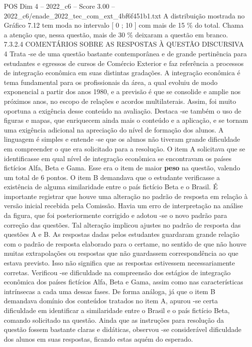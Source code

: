 \begin{textsample}{POS Dim 4 – 2022\_c6 – Score 3.00 – 2022\_c6/enade\_2022\_tec\_com\_ext\_4bf6f451b1.txt}
A distribuição mostrada no Gráfico 7.12 tem moda no intervalo [ 0 ; 10 ] com mais de 15 \% do total.
Chama a atenção que, nessa questão, mais de 30 \% deixaram a questão em branco. 7.3.2.4 COMENTÁRIOS SOBRE AS RESPOSTAS À QUESTÃO DISCURSIVA 4 Trata -se de uma questão bastante contemporânea e de grande pertinência para estudantes e egressos de cursos de Comércio Exterior e faz referência a processos de integração econômica em suas distintas gradações.
A integração econômica é tema fundamental para os profissionais da área, a qual evoluiu de modo exponencial a partir dos anos 1980, e a previsão é que se consolide e amplie nos próximos anos, no escopo de relações e acordos multilaterais.
Assim, foi muito oportuna a exigência desse conteúdo na avaliação.
Destaca -se também o uso de figuras e mapas, que enriquecem ainda mais o conteúdo e a aplicação, e se tornam uma exigência adicional na apreciação do nível de formação dos alunos.
A linguagem é simples e entende -se que os alunos não tiveram grande dificuldade em compreender o que era solicitado para a resolução.
O item A solicitava que se identificasse em qual nível de integração econômica se encontravam os países fictícios Alfa, Beta e Gama.
Esse era o item de maior \textbf{peso} na questão, valendo um total de 6 pontos.
O item B demandava que o estudante verificasse a existência de alguma similaridade entre o país fictício Beta e o Brasil.
É importante registrar que houve uma alteração no padrão de resposta em relação à versão inicial recebida pela Comissão.
Havia um erro de interpretação na análise da figura, que foi posteriormente corrigido e adotou -se o novo padrão para correção das questões.
Tal alteração implicou ajustes no padrão de resposta das questões A e B.
As respostas dadas pelos estudantes guardaram grande relação com o padrão de resposta elaborado para o certame, no sentido de que não houve muitas extrapolações ou respostas que não guardassem correspondência ao que estava previsto.
Isso não significa que as respostas estivessem necessariamente corretas.
Verificou -se dificuldade na compreensão dos estágios de integração econômica dos países fictícios Alfa, Beta e Gama, assim como nas características intrínsecas a cada uma dessas fases.
De forma análoga, já que o item B demandava domínio dos conteúdos tratados no item A, apurou -se certa dificuldade em identificar a similaridade entre o Brasil e o país fictício Beta, comando solicitado na questão.
Ainda que as instruções para resolução da questão fossem bastante claras e didáticas, observou -se considerável dificuldade dos alunos em suas respostas, ficando estas aquém do esperado.

\end{textsample}
